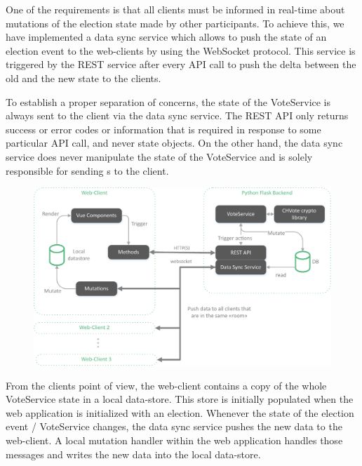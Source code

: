 One of the requirements is that all clients must be informed in real-time about mutations of the election state made by other participants. To achieve this, we have implemented a data sync service which allows to push the state of an election event to the web-clients by using the WebSocket protocol. This service is triggered by the REST service after every API call to push the delta between the old and the new state to the clients.

To establish a proper separation of concerns, the state of the VoteService is always sent to the client via the data sync service. The REST API only returns success or error codes or information that is required in response to some particular API call, and never state objects. On the other hand, the data sync service does never manipulate the state of the VoteService and is solely responsible for sending s to the client.

\begin{figure}[h!]
\begin{center}
\includegraphics[scale=0.7]{assets/chvoteArchitecture.pdf}
\label{Architecture}%
\end{center}
\end{figure}

From the clients point of view, the web-client contains a copy of the whole VoteService state in a local data-store. This store is initially populated when the web application is initialized with an election. Whenever the state of the election event / VoteService changes, the data sync service pushes the new data to the web-client. A local mutation handler within the web application handles those messages and writes the new data into the local data-store.


